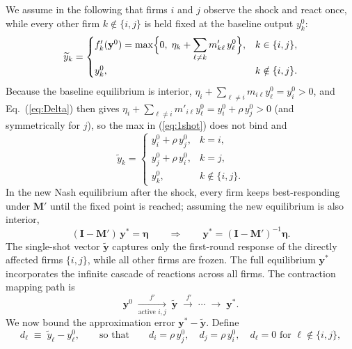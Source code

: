 We assume in the following that firms $i$ and $j$ observe the shock and react once, while every other firm $k\notin\{i,j\}$ is held fixed at the baseline output $y^{0}_{k}$:
\begin{equation}
\widetilde y_k =
\begin{cases}
f'_k(\mathbf y^{0})
   =\displaystyle \max\Bigl\{0,\;
        \eta_k + \sum_{\ell\neq k} m'_{k\ell}\,y^{0}_{\ell}
      \Bigr\},
      & k\in\{i,j\},\\[12pt]
y^{0}_{k},& k\notin\{i,j\}.
\end{cases}
\label{eq:1shot}
\end{equation}
Because the baseline equilibrium is interior, $\eta_i+\sum_{\ell\neq i}m_{i\ell}y^{0}_{\ell}=y^{0}_i>0$, and Eq.~(\ref{eq:Delta}) then gives $\eta_i+\sum_{\ell\neq i}m'_{i\ell}y^{0}_{\ell}=y^{0}_i+\rho\,y^{0}_j>0$ (and symmetrically for $j$), so the max in (\ref{eq:1shot}) does not bind and
\begin{equation}
\widetilde y_k=
\begin{cases}
\displaystyle
y^{0}_{i}+\rho\, y^{0}_{j}, & k=i,\\[8pt]
\displaystyle
y^{0}_{j}+\rho\, y^{0}_{i}, & k=j,\\[8pt]
y^{0}_{k},                                 & k \notin \{i,j\}.
\end{cases}
\label{eq:1shot-int}
\end{equation}
In the new Nash equilibrium after the shock, every firm keeps best-responding under $\mathbf M'$ until the fixed point is reached; assuming the new equilibrium is also interior,
\begin{equation}
(\mathbf I-\mathbf M')\,\mathbf y^{\ast}=\boldsymbol{\eta}
\qquad
\Longrightarrow\qquad
\mathbf y^{\ast}
   =(\mathbf I-\mathbf M')^{-1}\boldsymbol{\eta}.
\label{eq:NE'}
\end{equation}
The single-shot vector $\widetilde{\mathbf y}$ captures only the first-round response of the directly affected firms $\{i,j\}$, while all other firms are frozen. The full equilibrium $\mathbf y^{\ast}$ incorporates the infinite cascade of reactions across all firms. The contraction mapping path is
  \[
  \mathbf y^{0}\;\xrightarrow[\text{active }i,j]{f'}\;
  \widetilde{\mathbf y}\;\xrightarrow{\;f'}\;\cdots\;\longrightarrow\;
  \mathbf y^{\ast}.
  \]
We now bound the approximation error $\mathbf y^{\ast}-\widetilde{\mathbf y}$. Define
\[
d_\ell \;\equiv\; \widetilde y_\ell-y^{0}_\ell,
\qquad\text{so that}\qquad
d_i=\rho\,y^{0}_{j},\quad d_j=\rho\,y^{0}_{i},\quad d_\ell=0 \text{ for } \ell \notin \{i,j\},
\]
